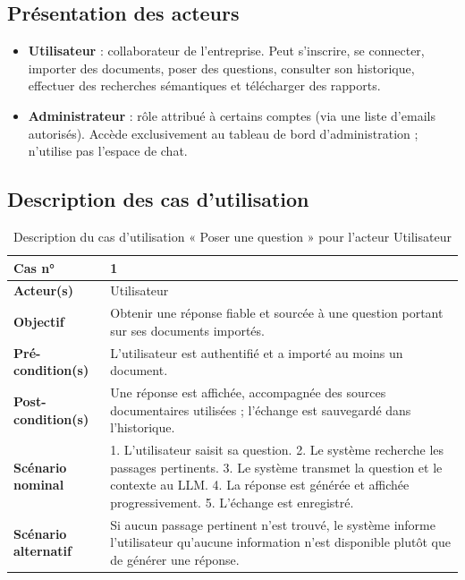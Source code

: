 \documentclass[12pt,a4paper]{report}
\begin{document}
\subsection{Présentation des acteurs}
\begin{itemize}
  \item \textbf{Utilisateur} : collaborateur de l'entreprise. Peut s'inscrire, se connecter, importer des documents, poser des questions, consulter son historique, effectuer des recherches sémantiques et télécharger des rapports.
  \item \textbf{Administrateur} : rôle attribué à certains comptes (via une liste d'emails autorisés). Accède exclusivement au tableau de bord d'administration ; n'utilise pas l'espace de chat.
\end{itemize}

\subsection{Description des cas d'utilisation}

\begin{table}[h]
\centering
\caption{Description du cas d'utilisation « Poser une question » pour l'acteur Utilisateur}
\begin{tabular}{|p{3.5cm}|p{9.5cm}|}
\hline
\textbf{Cas n°} & 1 \\
\hline
\textbf{Acteur(s)} & Utilisateur \\
\hline
\textbf{Objectif} & Obtenir une réponse fiable et sourcée à une question portant sur ses documents importés. \\
\hline
\textbf{Pré-condition(s)} & L'utilisateur est authentifié et a importé au moins un document. \\
\hline
\textbf{Post-condition(s)} & Une réponse est affichée, accompagnée des sources documentaires utilisées ; l'échange est sauvegardé dans l'historique. \\
\hline
\textbf{Scénario nominal} & 1. L'utilisateur saisit sa question. 2. Le système recherche les passages pertinents. 3. Le système transmet la question et le contexte au LLM. 4. La réponse est générée et affichée progressivement. 5. L'échange est enregistré. \\
\hline
\textbf{Scénario alternatif} & Si aucun passage pertinent n'est trouvé, le système informe l'utilisateur qu'aucune information n'est disponible plutôt que de générer une réponse. \\
\hline
\end{tabular}
\end{table}
\end{document}
